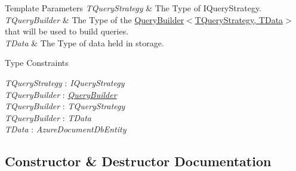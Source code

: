 \begin{DoxyTemplParams}{Template Parameters}
{\em T\+Query\+Strategy} & The Type of I\+Query\+Strategy.\\
\hline
{\em T\+Query\+Builder} & The Type of the \hyperlink{classCqrs_1_1Repositories_1_1Repository_a4447451b7dbcfcd68dfa3fa65a41f357_a4447451b7dbcfcd68dfa3fa65a41f357}{Query\+Builder$<$\+T\+Query\+Strategy, T\+Data$>$} that will be used to build queries.\\
\hline
{\em T\+Data} & The Type of data held in storage.\\
\hline
\end{DoxyTemplParams}
\begin{Desc}
\item[Type Constraints]\begin{description}
\item[{\em T\+Query\+Strategy} : {\em I\+Query\+Strategy}]\item[{\em T\+Query\+Builder} : {\em \hyperlink{classCqrs_1_1Repositories_1_1Repository_a4447451b7dbcfcd68dfa3fa65a41f357_a4447451b7dbcfcd68dfa3fa65a41f357}{Query\+Builder}}]\item[{\em T\+Query\+Builder} : {\em T\+Query\+Strategy}]\item[{\em T\+Query\+Builder} : {\em T\+Data}]\item[{\em T\+Data} : {\em Azure\+Document\+Db\+Entity}]\end{description}
\end{Desc}


\subsection{Constructor \& Destructor Documentation}
\mbox{\label{classCqrs_1_1Azure_1_1DocumentDb_1_1Repositories_1_1AzureRepository_a0cd5703c46fde3eeefcb02b1d0113640_a0cd5703c46fde3eeefcb02b1d0113640}} 
